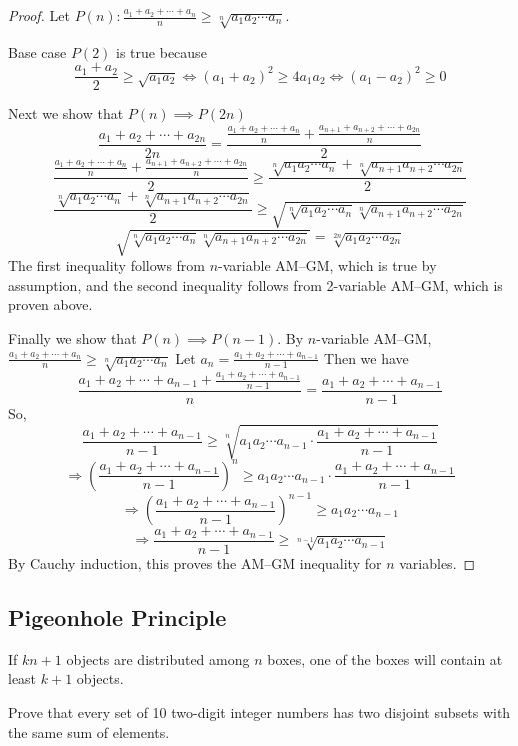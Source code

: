 \begin{proof}
Let $\displaystyle P(n):\frac{a_1+a_2+\cdots+a_n}{n}\ge\sqrt[n]{a_1a_2\cdots a_n}$.

Base case $P(2)$ is true because\[\frac{a_1+a_2}{2}\ge\sqrt{a_1a_2} \iff (a_1+a_2)^2\ge 4a_1a_2 \iff (a_1-a_2)^2\ge0\]

Next we show that $P(n)\implies P(2n)$
\[\frac{a_1+a_2+\cdots+a_{2n}}{2n}=\frac{\frac{a_1+a_2+\cdots+a_n}{n}+\frac{a_{n+1}+a_{n+2}+\cdots+a_{2n}}{n}}{2}\]\[\frac{\frac{a_1+a_2+\cdots+a_n}{n}+\frac{a_{n+1}+a_{n+2}+\cdots+a_{2n}}{n}}{2}\ge\frac{\sqrt[n]{a_1a_2\cdots a_n}+\sqrt[n]{a_{n+1}a_{n+2}\cdots a_{2n}}}{2}\]\[\frac{\sqrt[n]{a_1a_2\cdots a_n}+\sqrt[n]{a_{n+1}a_{n+2}\cdots a_{2n}}}{2}\ge\sqrt{\sqrt[n]{a_1a_2\cdots a_n}\sqrt[n]{a_{n+1}a_{n+2}\cdots a_{2n}}}\]\[\sqrt{\sqrt[n]{a_1a_2\cdots a_n}\sqrt[n]{a_{n+1}a_{n+2}\cdots a_{2n}}}=\sqrt[2n]{a_1a_2\cdots a_{2n}}\]
The first inequality follows from $n$-variable AM--GM, which is true by assumption, and the second inequality follows from 2-variable AM--GM, which is proven above.

Finally we show that $P(n)\implies P(n-1)$. By $n$-variable AM--GM, $\frac{a_1+a_2+\cdots+a_n}{n}\ge\sqrt[n]{a_1a_2\cdots a_n}$ Let $a_n=\frac{a_1+a_2+\cdots+a_{n-1}}{n-1}$ Then we have\[\frac{a_1+a_2+\cdots+a_{n-1}+\frac{a_1+a_2+\cdots+a_{n-1}}{n-1}}{n}=\frac{a_1+a_2+\cdots+a_{n-1}}{n-1}\]So,\[\frac{a_1+a_2+\cdots+a_{n-1}}{n-1}\ge\sqrt[n]{a_1a_2\cdots a_{n-1}\cdot \frac{a_1+a_2+\cdots+a_{n-1}}{n-1}}\]\[\Rightarrow\left(\frac{a_1+a_2+\cdots+a_{n-1}}{n-1}\right)^n\ge a_1a_2\cdots a_{n-1}\cdot \frac{a_1+a_2+\cdots+a_{n-1}}{n-1}\]\[\Rightarrow\left(\frac{a_1+a_2+\cdots+a_{n-1}}{n-1}\right)^{n-1}\ge a_1a_2\cdots a_{n-1}\]\[\Rightarrow \frac{a_1+a_2+\cdots+a_{n-1}}{n-1}\ge\sqrt[n-1]{a_1a_2\cdots a_{n-1}}\]
By Cauchy induction, this proves the AM--GM inequality for $n$ variables.
\end{proof}

\subsection{Pigeonhole Principle}
\begin{theorem}
If $kn+1$ objects are distributed among $n$ boxes, one of the boxes will contain at least $k+1$ objects.
\end{theorem}

\begin{exercise}[IMO 1972]
Prove that every set of 10 two-digit integer numbers has two disjoint subsets with the same sum of elements.
\end{exercise}

